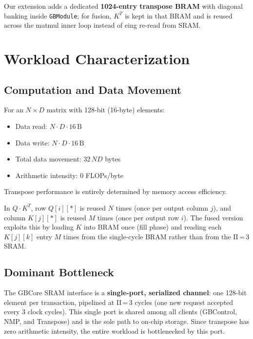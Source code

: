\documentclass[11pt]{article}
\begin{document}
Our extension adds a dedicated \textbf{1024-entry transpose BRAM} with
diagonal banking inside \texttt{GBModule}; for fusion, $K^T$ is kept in that BRAM and is reused across the matmul inner loop instead of eing re-read from SRAM.

\section{Workload Characterization}
\label{sec:workload}

\subsection{Computation and Data Movement}
For an $N\!\times\!D$ matrix with 128-bit (16-byte) elements:

\begin{itemize}[nosep]
  \item Data read: $N \cdot D \cdot 16\,\text{B}$
  \item Data write: $N \cdot D \cdot 16\,\text{B}$
  \item Total data movement: $32\,N\!D$ bytes
  \item Arithmetic intensity: $0$ FLOPs/byte
\end{itemize}

Transpose performance is entirely determined by memory access efficiency.

In $Q\!\cdot\!K^T$, row $Q[i][*]$ is reused $N$ times (once per output
column $j$), and column $K[j][*]$ is reused $M$ times (once per output
row $i$).  The fused version exploits this by loading $K$ into BRAM
once (fill phase) and reading each $K[j][k]$ entry $M$ times from the
single-cycle BRAM rather than from the II\,=\,3 SRAM.

\subsection{Dominant Bottleneck}

The GBCore SRAM interface is a \textbf{single-port, serialized channel}:
one 128-bit element per transaction, pipelined at II\,=\,3 cycles (one
new request accepted every 3 clock cycles).  This single port is shared
among all clients (GBControl, NMP, and Transpose) and is the sole path to
on-chip storage. Since transpose has zero arithmetic intensity, the
entire workload is bottlenecked by this port.
\end{document}
